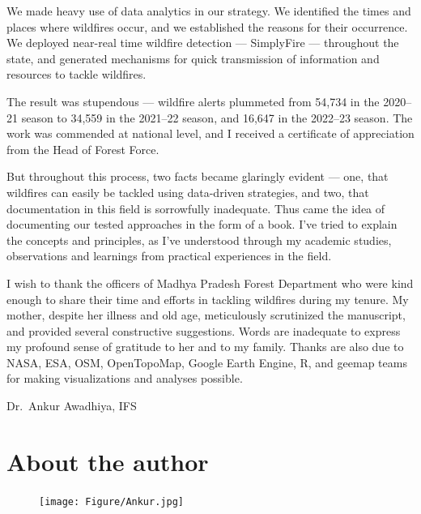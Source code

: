 \documentclass[
  12 pt,
]{Nemilov}
\begin{document}
We made heavy use of data analytics in our strategy. We identified the times and places where wildfires occur, and we established the reasons for their occurrence. We deployed near-real time wildfire detection --- SimplyFire --- throughout the state, and generated mechanisms for quick transmission of information and resources to tackle wildfires.

The result was stupendous --- wildfire alerts plummeted from 54,734 in the 2020--21 season to 34,559 in the 2021--22 season, and 16,647 in the 2022--23 season. The work was commended at national level, and I received a certificate of appreciation from the Head of Forest Force.

But throughout this process, two facts became glaringly evident --- one, that wildfires can easily be tackled using data-driven strategies, and two, that documentation in this field is sorrowfully inadequate. Thus came the idea of documenting our tested approaches in the form of a book. I've tried to explain the concepts and principles, as I've understood through my academic studies, observations and learnings from practical experiences in the field.

I wish to thank the officers of Madhya Pradesh Forest Department who were kind enough to share their time and efforts in tackling wildfires during my tenure. My mother, despite her illness and old age, meticulously scrutinized the manuscript, and provided several constructive suggestions. Words are inadequate to express my profound sense of gratitude to her and to my family. Thanks are also due to NASA, ESA, OSM, OpenTopoMap, Google Earth Engine, R, and geemap teams for making visualizations and analyses possible.

\hfill Dr.~Ankur Awadhiya, IFS

\chapter*{About the author}\label{about-the-author}


\begin{figure}[ht!]
\centering
\texttt{[image: Figure/Ankur.jpg]}
\end{figure}
\end{document}
